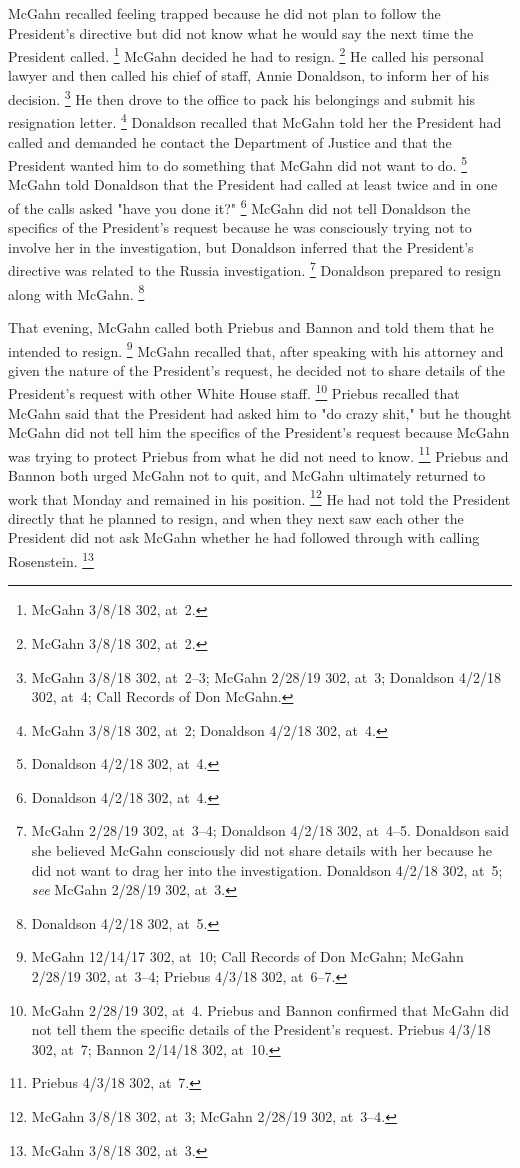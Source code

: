 {McGahn recalled feeling trapped because he did not plan to follow the President's directive but did not know what he would say the next time the President called.%
\footnote{McGahn 3/8/18 302, at~2.}
McGahn decided he had to resign.%
\footnote{McGahn 3/8/18 302, at~2.}
He called his personal lawyer and then called his chief of staff, Annie Donaldson, to inform her of his decision.%
\footnote{McGahn 3/8/18 302, at~2--3;
McGahn 2/28/19 302, at~3;
Donaldson 4/2/18 302, at~4;
Call Records of Don McGahn.}
He then drove to the office to pack his belongings and submit his resignation letter.%
\footnote{McGahn 3/8/18 302, at~2;
Donaldson 4/2/18 302, at~4.}
Donaldson recalled that McGahn told her the President had called and demanded he contact the Department of Justice and that the President wanted him to do something that McGahn did not want to do.%
\footnote{Donaldson 4/2/18 302, at~4.}
McGahn told Donaldson that the President had called at least twice and in one of the calls asked "have you done it?"%
\footnote{Donaldson 4/2/18 302, at~4.}
McGahn did not tell Donaldson the specifics of the President's request because he was consciously trying not to involve her in the investigation, but Donaldson inferred that the President's directive was related to the Russia investigation.%
\footnote{McGahn 2/28/19 302, at~3--4;
Donaldson 4/2/18 302, at~4--5.
Donaldson said she believed McGahn consciously did not share details with her because he did not want to drag her into the investigation.
Donaldson 4/2/18 302, at~5;
\textit{see} McGahn 2/28/19 302, at~3.}
Donaldson prepared to resign along with McGahn.%
\footnote{Donaldson 4/2/18 302, at~5.}

That evening, McGahn called both Priebus and Bannon and told them that he intended to resign.%
\footnote{McGahn 12/14/17 302, at~10;
Call Records of Don McGahn;
McGahn 2/28/19 302, at~3--4;
Priebus 4/3/18 302, at~6--7.}
McGahn recalled that, after speaking with his attorney and given the nature of the President's request, he decided not to share details of the President's request with other White House staff.%
\footnote{McGahn 2/28/19 302, at~4.
Priebus and Bannon confirmed that McGahn did not tell them the specific details of the President's request.
Priebus 4/3/18 302, at~7;
Bannon 2/14/18 302, at~10.}
Priebus recalled that McGahn said that the President had asked him to "do crazy shit," but he thought McGahn did not tell him the specifics of the President's request because McGahn was trying to protect Priebus from what he did not need to know.%
\footnote{Priebus 4/3/18 302, at~7.}
Priebus and Bannon both urged McGahn not to quit, and McGahn ultimately returned to work that Monday and remained in his position.%
\footnote{McGahn 3/8/18 302, at~3;
McGahn 2/28/19 302, at~3--4.}
He had not told the President directly that he planned to resign, and when they next saw each other the President did not ask McGahn whether he had followed through with calling Rosenstein.%
\footnote{McGahn 3/8/18 302, at~3.}

}
